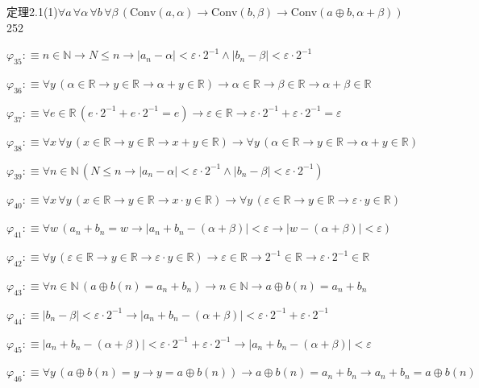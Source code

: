 \begin{fullproof}{定理2.1(1)}{$\forall a\,\forall \alpha\,\forall b\,\forall \beta\,(\mathrm{Conv}(a,\alpha) \to \mathrm{Conv}(b,\beta) \to \mathrm{Conv}(a \oplus b,\alpha + \beta))$}{252}
\begin{abbrevlist}
\item $\varphi_{35} :\equiv n \in \mathbb{N} \to N \leq n \to \lvert a_{n} - \alpha \rvert < \varepsilon \cdot 2^{-1} \land \lvert b_{n} - \beta \rvert < \varepsilon \cdot 2^{-1}$
\item $\varphi_{36} :\equiv \forall y\,(\alpha \in \mathbb{R} \to y \in \mathbb{R} \to \alpha + y \in \mathbb{R}) \to \alpha \in \mathbb{R} \to \beta \in \mathbb{R} \to \alpha + \beta \in \mathbb{R}$
\item $\varphi_{37} :\equiv \forall e \in \mathbb{R}\,(e \cdot 2^{-1} + e \cdot 2^{-1} = e) \to \varepsilon \in \mathbb{R} \to \varepsilon \cdot 2^{-1} + \varepsilon \cdot 2^{-1} = \varepsilon$
\item $\varphi_{38} :\equiv \forall x\,\forall y\,(x \in \mathbb{R} \to y \in \mathbb{R} \to x + y \in \mathbb{R}) \to \forall y\,(\alpha \in \mathbb{R} \to y \in \mathbb{R} \to \alpha + y \in \mathbb{R})$
\item $\varphi_{39} :\equiv \forall n \in \mathbb{N}\,(N \leq n \to \lvert a_{n} - \alpha \rvert < \varepsilon \cdot 2^{-1} \land \lvert b_{n} - \beta \rvert < \varepsilon \cdot 2^{-1})$
\item $\varphi_{40} :\equiv \forall x\,\forall y\,(x \in \mathbb{R} \to y \in \mathbb{R} \to x \cdot y \in \mathbb{R}) \to \forall y\,(\varepsilon \in \mathbb{R} \to y \in \mathbb{R} \to \varepsilon \cdot y \in \mathbb{R})$
\item $\varphi_{41} :\equiv \forall w\,(a_{n} + b_{n} = w \to \lvert a_{n} + b_{n} - (\alpha + \beta) \rvert < \varepsilon \to \lvert w - (\alpha + \beta) \rvert < \varepsilon)$
\item $\varphi_{42} :\equiv \forall y\,(\varepsilon \in \mathbb{R} \to y \in \mathbb{R} \to \varepsilon \cdot y \in \mathbb{R}) \to \varepsilon \in \mathbb{R} \to 2^{-1} \in \mathbb{R} \to \varepsilon \cdot 2^{-1} \in \mathbb{R}$
\item $\varphi_{43} :\equiv \forall n \in \mathbb{N}\,(a \oplus b(n) = a_{n} + b_{n}) \to n \in \mathbb{N} \to a \oplus b(n) = a_{n} + b_{n}$
\item $\varphi_{44} :\equiv \lvert b_{n} - \beta \rvert < \varepsilon \cdot 2^{-1} \to \lvert a_{n} + b_{n} - (\alpha + \beta) \rvert < \varepsilon \cdot 2^{-1} + \varepsilon \cdot 2^{-1}$
\item $\varphi_{45} :\equiv \lvert a_{n} + b_{n} - (\alpha + \beta) \rvert < \varepsilon \cdot 2^{-1} + \varepsilon \cdot 2^{-1} \to \lvert a_{n} + b_{n} - (\alpha + \beta) \rvert < \varepsilon$
\item $\varphi_{46} :\equiv \forall y\,(a \oplus b(n) = y \to y = a \oplus b(n)) \to a \oplus b(n) = a_{n} + b_{n} \to a_{n} + b_{n} = a \oplus b(n)$

\end{abbrevlist}
\end{fullproof}
